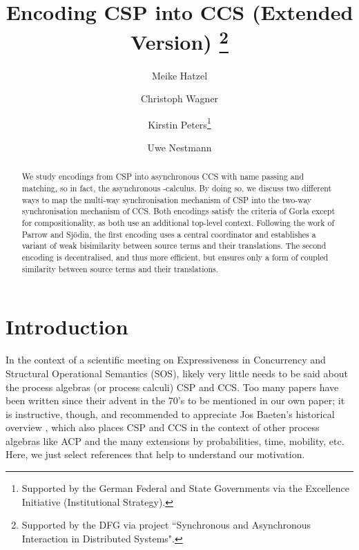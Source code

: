 \documentclass[]{eptcs}
\title{Encoding CSP into CCS (Extended Version)
	\thanks{Supported by the DFG via project ``Synchronous and Asynchronous Interaction in Distributed Systems".}}
\author{Meike Hatzel 
	\institute{TU Berlin}
	\and Christoph Wagner
	\institute{TU Berlin}
	\and Kirstin Peters\thanks{Supported by the German Federal and State Governments via the Excellence Initiative (Institutional Strategy).}
	\institute{TU Dresden}
	\and Uwe Nestmann
	\institute{TU Berlin}
}
\begin{document}
\maketitle

\begin{abstract}
	We study encodings from CSP into asynchronous CCS with name passing and matching, so in fact, the asynchronous -calculus. By doing so, we discuss two different ways to map the multi-way synchronisation mechanism of CSP into the two-way synchronisation mechanism of CCS. Both encodings satisfy the criteria of Gorla except for compositionality, as both use an additional top-level context. Following the work of Parrow and Sjödin, the first encoding uses a central coordinator and establishes a variant of weak bisimilarity between source terms and their translations. The second encoding is decentralised, and thus more efficient, but ensures only a form of coupled similarity between source terms and their translations.
\end{abstract}


\section{Introduction}

In the context of a scientific meeting on Expressiveness in Concurrency and Structural Operational Semantics (SOS), likely very little needs to be said about the process algebras (or process calculi) CSP and CCS. Too many papers have been written since their advent in the 70's to be mentioned in our own paper; it is instructive, though, and recommended to appreciate Jos Baeten's historical overview \cite{Baeten:2005:BHP:1085667.1085669}, which also places CSP and CCS in the context of other process algebras like ACP and the many extensions by probabilities, time, mobility, etc. Here, we just select references that help to understand our motivation.
\end{document}
